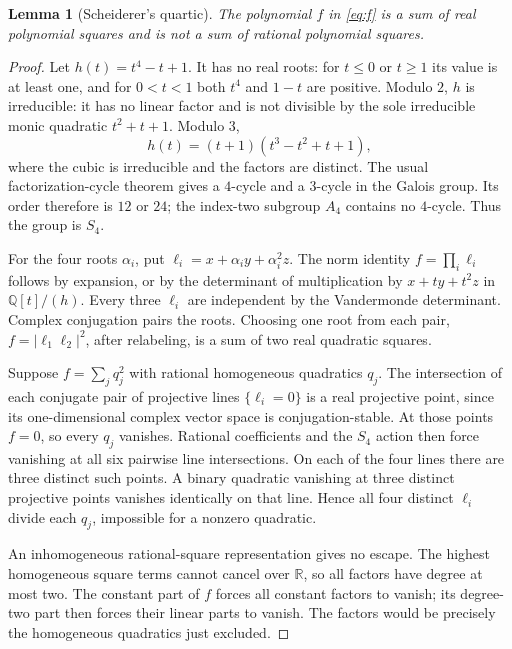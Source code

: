 \documentclass[11pt]{article}
\newcommand{\Q}{\mathbb Q}
\newcommand{\R}{\mathbb R}
\newtheorem{lemma}{Lemma}
\begin{document}
\begin{lemma}[Scheiderer's quartic]\label{lem:quartic}
The polynomial \(f\) in \eqref{eq:f} is a sum of real polynomial squares
and is not a sum of rational polynomial squares.
\end{lemma}
\begin{proof}
Let \(h(t)=t^4-t+1\). It has no real roots: for \(t\leq0\) or
\(t\geq1\) its value is at least one, and for \(0<t<1\) both
\(t^4\) and \(1-t\) are positive. Modulo \(2\), \(h\) is irreducible:
it has no linear factor and is not divisible by the sole irreducible
monic quadratic \(t^2+t+1\). Modulo \(3\),
\[
 h(t)=(t+1)(t^3-t^2+t+1),
\]
where the cubic is irreducible and the factors are distinct.
The usual factorization-cycle theorem gives a \(4\)-cycle and a \(3\)-cycle
in the Galois group. Its order therefore is \(12\) or \(24\);
the index-two subgroup \(A_4\) contains no \(4\)-cycle. Thus the group is
\(S_4\).

For the four roots \(\alpha_i\), put
\(\ell_i=x+\alpha_i y+\alpha_i^2z\).
The norm identity \(f=\prod_i\ell_i\) follows by expansion, or by the
determinant of multiplication by \(x+ty+t^2z\) in \(\Q[t]/(h)\).
Every three \(\ell_i\) are independent by the Vandermonde determinant.
Complex conjugation pairs the roots. Choosing one root from each pair,
\(f=|\ell_1\ell_2|^2\), after relabeling, is a sum of two real
quadratic squares.

Suppose \(f=\sum_j q_j^2\) with rational homogeneous quadratics \(q_j\).
The intersection of each conjugate pair of projective lines
\(\{\ell_i=0\}\) is a real projective point, since its one-dimensional
complex vector space is conjugation-stable. At those points \(f=0\),
so every \(q_j\) vanishes. Rational coefficients and the \(S_4\) action
then force vanishing at all six pairwise line intersections.
On each of the four lines there are three distinct such points.
A binary quadratic vanishing at three distinct projective points
vanishes identically on that line. Hence all four distinct \(\ell_i\)
divide each \(q_j\), impossible for a nonzero quadratic.

An inhomogeneous rational-square representation gives no escape.
The highest homogeneous square terms cannot cancel over \(\R\),
so all factors have degree at most two. The constant part of \(f\)
forces all constant factors to vanish; its degree-two part then
forces their linear parts to vanish. The factors would be precisely
the homogeneous quadratics just excluded.
\end{proof}
\end{document}
